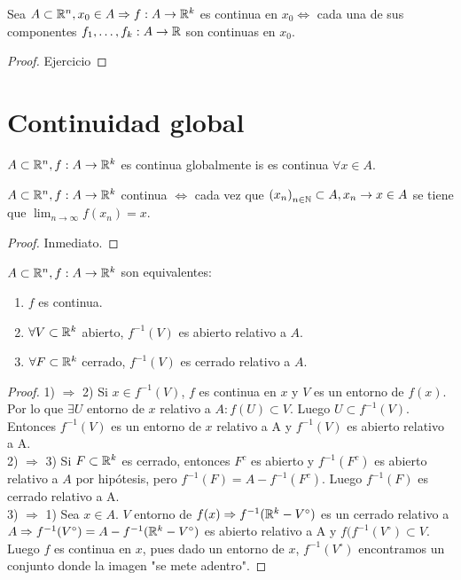 \begin{prop}
  Sea \(A \subset \mathbb{R}^n, x_0 \in A \Rightarrow f: A \to \mathbb{R}^k\) es continua en \(x_0 \iff \) cada una de sus componentes \(f_1, \ldots, f_k: A \to \mathbb{R} \) son continuas en \(x_0\).
  \begin{proof}
    Ejercicio
  \end{proof}
\end{prop}

\section{Continuidad global}

\begin{definition}
  \(A \subset \mathbb{R}^n, f: A \to \mathbb{R}^k\) es continua globalmente is es continua \(\forall x \in A\).
\end{definition}

\begin{prop}
  \(A \subset \mathbb{R}^n, f: A \to \mathbb{R}^k\) continua \(\iff \) cada vez que \({(x_n)}_{n \in \mathbb{N}} \subset A, x_n \to x \in A\) se tiene que \(\lim_{n \to \infty} f(x_n) = x\).
  \begin{proof}
    Inmediato.
  \end{proof}
\end{prop}

\begin{prop}
  \(A \subset \mathbb{R}^n, f: A \to \mathbb{R}^k\) son equivalentes:
  \begin{enumerate}
    \item \(f\) es continua.
    \item \(\forall V \subset \mathbb{R}^k\) abierto, \(f^{-1}(V)\) es abierto relativo a \(A\).
    \item \(\forall F \subset \mathbb{R}^k\) cerrado, \(f^{-1}(V)\) es cerrado relativo a \(A\).
  \end{enumerate}
  \begin{proof}
    1) \(\Rightarrow \) 2)  Si \(x \in f^{-1}(V)\), \(f\) es continua en \(x\) y \(V\) es un entorno de \(f(x)\). Por lo que \(\exists U\) entorno de \(x\) relativo a \(A : f(U) \subset V\). Luego \(U \subset f^{-1}(V)\). Entonces \(f^{-1}(V)\) es un entorno de \(x\) relativo a A y \(f^{-1}(V)\) es abierto relativo a A. \\
    2) \(\Rightarrow \) 3) Si \(F \subset \mathbb{R}^k\) es cerrado, entonces \(F^c\) es abierto y \(f^{-1}(F^c)\) es abierto relativo a \(A\) por hipótesis, pero \(f^{-1}(F) = A - f^{-1}(F^c)\). Luego \(f^{-1}(F)\) es cerrado relativo a A. \\
    3) \(\Rightarrow \) 1) Sea \(x \in A\). \(V\) entorno de \(f(x) \Rightarrow f^{-1}(\mathbb{R}^k - V^{\circ})\) es un cerrado relativo a \(A \Rightarrow f^{-1}(V^{\circ}) = A - f^{-1}(\mathbb{R}^k - V^{\circ})\) es abierto relativo a A y \(f(f^{-1}(V^{\circ}) \subset V\). Luego \(f\) es continua en \(x\), pues dado un entorno de \(x\), \(f^{-1}(V^{\circ})\) encontramos un conjunto donde la imagen "se mete adentro".
  \end{proof}
\end{prop}


